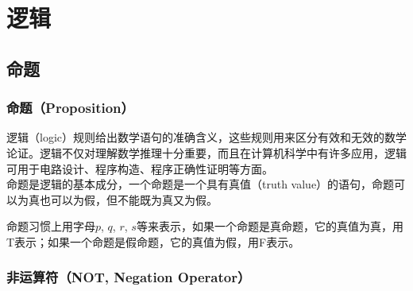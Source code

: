 \documentclass[12pt, openany, oneside]{book}
\begin{document}
\newpage

\pagestyle{plain}
\setcounter{page}{1}
\setcounter{tocdepth}{1}
\tableofcontents

\newpage

\setcounter{page}{1}

\chapter{逻辑}

\section{命题}

\subsection{命题（Proposition）}

逻辑（logic）规则给出数学语句的准确含义，这些规则用来区分有效和无效的数学论证。逻辑不仅对理解数学推理十分重要，而且在计算机科学中有许多应用，逻辑可用于电路设计、程序构造、程序正确性证明等方面。\\

命题是逻辑的基本成分，一个命题是一个具有真值（truth value）的语句，命题可以为真也可以为假，但不能既为真又为假。

\begin{table}[H]
	\centering
	\caption{命题与非命题}
\end{table}

命题习惯上用字母$ p $, $ q $, $ r $, $ s $等来表示，如果一个命题是真命题，它的真值为真，用T表示；如果一个命题是假命题，它的真值为假，用F表示。\\

\subsection{非运算符（NOT, Negation Operator）}
\end{document}
